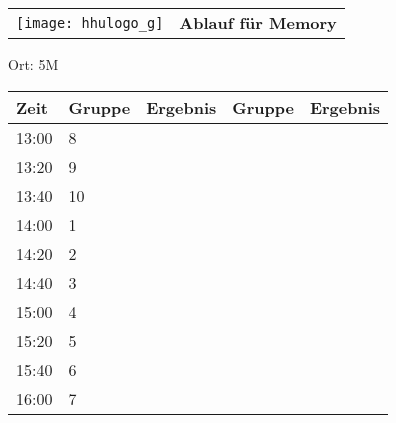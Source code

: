 \documentclass[a4paper,10pt]{article}
\def\spielh{Memory}
\def\raumh{5M}
\begin{document}
   \newpage
  \begin{tabularx}{\textwidth}{lc}
    \texttt{[image: hhulogo\_g]}
  & {\Huge \textbf{Ablauf für \spielh}}
  \end{tabularx}
  \LARGE
  \begin{center}
    \vspace{1cm} 
    Ort: \raumh
  \end{center}
    \vspace{2cm} 
    \begin{tabularx}{\textwidth}{X||X|X||X|X}
	\textbf{Zeit} &\textbf{Gruppe} & \textbf{Ergebnis} &\textbf{Gruppe} & \textbf{Ergebnis}  	\\ \hline \hline
	13:00 &	8	&	&	&	\\ \hline
	13:20 &	9	&	&	&	\\ \hline
	13:40 &	10	&	&	&	\\ \hline

	14:00 &	1	&	&	&	\\ \hline
	14:20 &	2	&	&	&	\\ \hline
	14:40 &	3	&	&	&	\\ \hline

	15:00 &	4	&	&	&	\\ \hline
	15:20 &	5	&	&	&	\\ \hline
	15:40 &	6	&	&	&	\\ \hline

	16:00 &	7	&	&	&	\\ \hline
      
    \end{tabularx}
   
\end{document}
